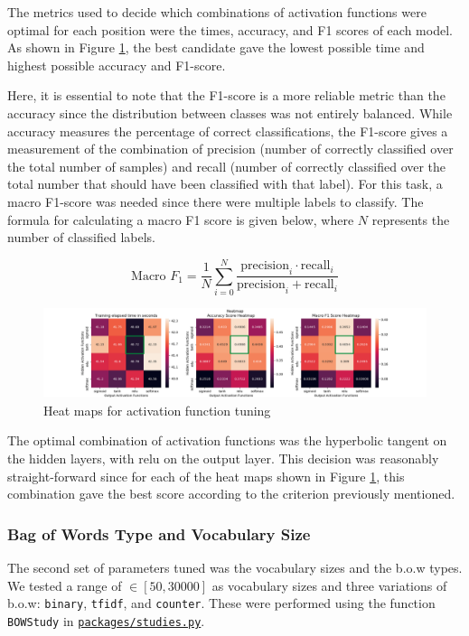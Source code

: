 The metrics used to decide which combinations of activation functions were optimal for each position were the times, accuracy, and F1 scores of each model. As shown in Figure \ref{fig:act_heatmap}, the best candidate gave the lowest possible time and highest possible accuracy and F1-score. 

Here, it is essential to note that the F1-score is a more reliable metric than the accuracy since the distribution between classes was not entirely balanced. While accuracy measures the percentage of correct classifications, the F1-score gives a measurement of the combination of precision (number of correctly classified over the total number of samples) and recall (number of correctly classified over the total number that should have been classified with that label). For this task, a macro F1-score was needed since there were multiple labels to classify. The formula for calculating a macro F1 score is given below, where $N$ represents the number of classified labels.

$$
\text{Macro }F_1 = \frac{1}{N} \sum_{i=0}^{N} \frac{\text{precision}_i\cdot\text{recall}_i}{\text{precision}_i+\text{recall}_i}
$$


\begin{figure}[H]
\centering
\includegraphics[width=1\linewidth]{pictures/activation_heatmap.png}
\caption{Heat maps for activation function tuning}
\label{fig:act_heatmap}
\end{figure}

The optimal combination of activation functions was the hyperbolic tangent on the hidden layers, with relu on the output layer. This decision was reasonably straight-forward since for each of the heat maps shown in Figure \ref{fig:act_heatmap}, this combination gave the best score according to the criterion previously mentioned. \\

\subsubsection{Bag of Words Type and Vocabulary Size}
\quad The second set of parameters tuned was the vocabulary sizes and the b.o.w types. We tested a range of $\in[50, 30000]$ as vocabulary sizes and three variations of b.o.w: \texttt{binary}, \texttt{tfidf}, and \texttt{counter}. These were performed using the function \texttt{BOWStudy} in \href{https://github.uio.no/fabior/IN5550/blob/master/Oblig1/packages/studies.py}{\texttt{packages/studies.py}}.

